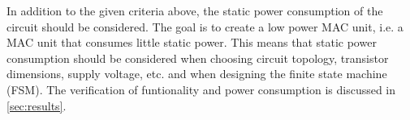 In addition to the given criteria above, the static power consumption of the circuit should be considered. The goal is to create a low power MAC unit, i.e. a MAC unit that consumes little static power. This means that static power consumption should be considered when choosing circuit topology, transistor dimensions, supply voltage, etc. and when designing the finite state machine (FSM). The verification of funtionality and power consumption is discussed in \autoref{sec:results}.